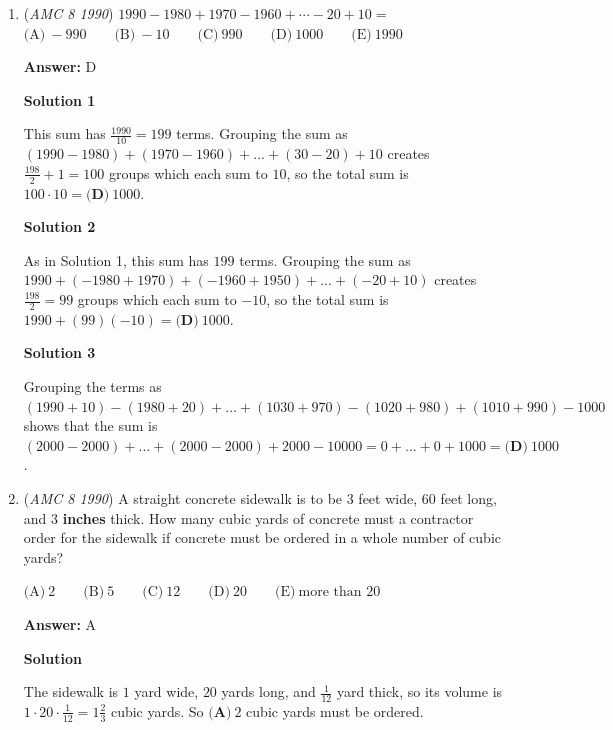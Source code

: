\begin{enumerate}
 


	\item (\textit{AMC 8 1990}) $1990-1980+1970-1960+\cdots -20+10 =$
$\text{(A)}\ -990 \qquad \text{(B)}\ -10 \qquad \text{(C)}\ 990 \qquad \text{(D)}\ 1000 \qquad \text{(E)}\ 1990$

 \textbf{Answer: }D



\textbf{Solution 1}

This sum has $\frac{1990}{10} = 199$ terms.  Grouping the sum as $(1990-1980)+(1970-1960)+...+(30-20)+10$ creates $\frac{198}{2} + 1 = 100$ groups which each sum to $10$, so the total sum is $100\cdot 10 = \boxed{\textbf{(D)}\ 1000}$.

 



\textbf{Solution 2}

As in Solution 1, this sum has $199$ terms.  Grouping the sum as $1990 + (-1980+1970) + (-1960+1950) + ... + (-20+10)$ creates $\frac{198}{2} = 99$ groups which each sum to $-10$, so the total sum is $1990 + (99)(-10) = \boxed{\textbf{(D)}\ 1000}$.

 



\textbf{Solution 3}

Grouping the terms as $(1990 + 10) - (1980 + 20) + ... + (1030 + 970) - (1020 + 980) + (1010 + 990) - 1000$ shows that the sum is $(2000 - 2000) + ... + (2000 - 2000) + 2000 - 10000 = 0 + ... + 0 + 1000 = \boxed{\textbf{(D)}\ 1000}$.

 


 


	\item (\textit{AMC 8 1990}) A straight concrete sidewalk is to be $3$ feet wide, $60$ feet long, and $3$ \textbf{inches} thick.  How many cubic yards of concrete must a contractor order for the sidewalk if concrete must be ordered in a whole number of cubic yards?


 $\text{(A)}\ 2 \qquad \text{(B)}\ 5 \qquad \text{(C)}\ 12 \qquad \text{(D)}\ 20 \qquad \text{(E)}\ \text{more than 20}$

 \textbf{Answer: }A



\textbf{Solution}

The sidewalk is $1$ yard wide, $20$ yards long, and $\frac{1}{12}$ yard thick, so its volume is $1\cdot 20\cdot\frac{1}{12} = 1\frac{2}{3}$ cubic yards.  So $\boxed{\textbf{(A)}\ 2}$ cubic yards must be ordered.


\end{enumerate}
